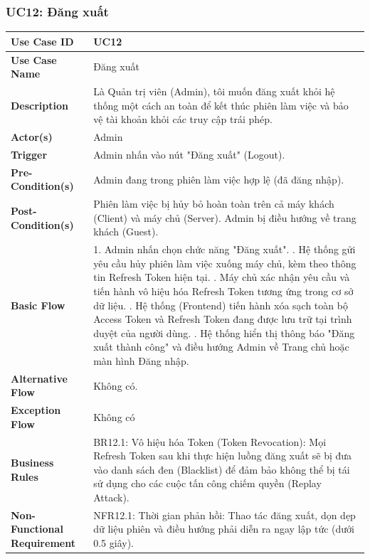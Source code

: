 \documentclass[a4paper,12pt]{article}
\begin{document}
\subsubsection{UC12: Đăng xuất}
\begin{longtable}{|p{4cm}|p{11.5cm}|}
\hline
\textbf{Use Case ID} & UC12 \\ \hline
\textbf{Use Case Name} & Đăng xuất \\ \hline
\textbf{Description} & Là Quản trị viên (Admin), tôi muốn đăng xuất khỏi hệ thống một cách an toàn để kết thúc phiên làm việc và bảo vệ tài khoản khỏi các truy cập trái phép. \\ \hline
\textbf{Actor(s)} & Admin \\ \hline
\textbf{Trigger} & Admin nhấn vào nút "Đăng xuất" (Logout). \\ \hline
\textbf{Pre-Condition(s)} & Admin đang trong phiên làm việc hợp lệ (đã đăng nhập). \\ \hline
\textbf{Post-Condition(s)} & Phiên làm việc bị hủy bỏ hoàn toàn trên cả máy khách (Client) và máy chủ (Server). Admin bị điều hướng về trang khách (Guest). \\ \hline
\textbf{Basic Flow} & 
1. Admin nhấn chọn chức năng "Đăng xuất". \newline
2. Hệ thống gửi yêu cầu hủy phiên làm việc xuống máy chủ, kèm theo thông tin Refresh Token hiện tại. \newline
3. Máy chủ xác nhận yêu cầu và tiến hành vô hiệu hóa Refresh Token tương ứng trong cơ sở dữ liệu. \newline
4. Hệ thống (Frontend) tiến hành xóa sạch toàn bộ Access Token và Refresh Token đang được lưu trữ tại trình duyệt của người dùng. \newline
5. Hệ thống hiển thị thông báo "Đăng xuất thành công" và điều hướng Admin về Trang chủ hoặc màn hình Đăng nhập. \\ \hline
\textbf{Alternative Flow} & 
Không có. \\ \hline
\textbf{Exception Flow} & 
Không có \\ \hline
\textbf{Business Rules} & 
BR12.1: Vô hiệu hóa Token (Token Revocation): Mọi Refresh Token sau khi thực hiện luồng đăng xuất sẽ bị đưa vào danh sách đen (Blacklist) để đảm bảo không thể bị tái sử dụng cho các cuộc tấn công chiếm quyền (Replay Attack). \\ \hline
\textbf{Non-Functional Requirement} & 
NFR12.1: Thời gian phản hồi: Thao tác đăng xuất, dọn dẹp dữ liệu phiên và điều hướng phải diễn ra ngay lập tức (dưới 0.5 giây). \\ \hline
\end{longtable}
\end{document}
